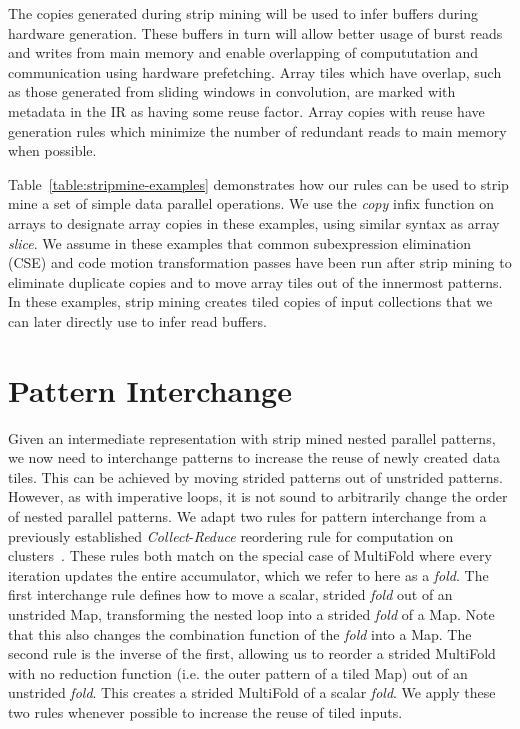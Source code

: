 The copies generated during strip mining will be used to infer buffers during hardware generation.
These buffers in turn will allow better usage of burst reads and writes from main memory and enable overlapping of compututation and communication using hardware prefetching.
Array tiles which have overlap, such as those generated from sliding windows in convolution, are marked with metadata in the IR as having some reuse factor.
Array copies with reuse have generation rules which minimize the number of redundant reads to main memory when possible.



Table~\ref{table:stripmine-examples} demonstrates how our rules can be used to strip mine a set of simple data parallel operations.
We use the \emph{copy} infix function on arrays to designate array copies in these examples, using similar syntax as array \emph{slice}.
We assume in these examples that common subexpression elimination (CSE) and code motion transformation passes have been run after strip mining to eliminate duplicate copies and to
move array tiles out of the innermost patterns. In these examples, strip mining creates tiled copies of input collections that
we can later directly use to infer read buffers.

\section{Pattern Interchange}



Given an intermediate representation with strip mined nested parallel patterns, we now need to interchange patterns to increase the reuse
of newly created data tiles. This can be achieved by moving strided patterns out of unstrided patterns. However, as with imperative loops,
it is not sound to arbitrarily change the order of nested parallel patterns.
We adapt two rules for pattern interchange from a previously established \emph{Collect}-\emph{Reduce} reordering rule for computation on clusters~\cite{brown16clusters}.
These rules both match on the special case of MultiFold where every iteration updates the entire accumulator, which we refer to here as a \emph{fold}.
The first interchange rule defines how to move a scalar, strided \emph{fold} out of an unstrided Map, transforming the nested loop into a strided \emph{fold} of a Map.
Note that this also changes the combination function of the \emph{fold} into a Map.
The second rule is the inverse of the first, allowing us to reorder a strided MultiFold with no reduction function (i.e. the outer pattern of a tiled Map)
out of an unstrided \emph{fold}. This creates a strided MultiFold of a scalar \emph{fold}. We apply these two rules whenever possible to increase the reuse
of tiled inputs.

